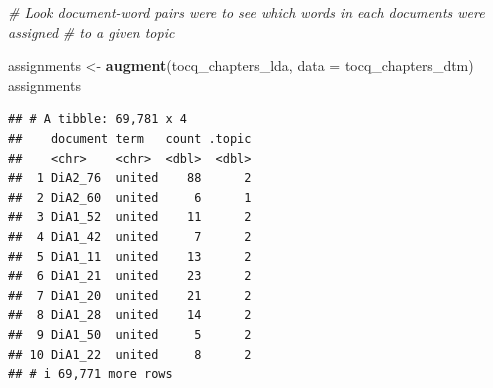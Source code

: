 \documentclass[
]{article}
\newenvironment{Shaded}{\begin{snugshade}}{\end{snugshade}}
\newcommand{\AttributeTok}[1]{\textcolor[rgb]{0.13,0.29,0.53}{#1}}
\newcommand{\CommentTok}[1]{\textcolor[rgb]{0.56,0.35,0.01}{\textit{#1}}}
\newcommand{\FunctionTok}[1]{\textcolor[rgb]{0.13,0.29,0.53}{\textbf{#1}}}
\newcommand{\NormalTok}[1]{#1}
\newcommand{\OtherTok}[1]{\textcolor[rgb]{0.56,0.35,0.01}{#1}}
\begin{document}
\begin{Shaded}
\begin{Highlighting}[]
\CommentTok{\# Look document{-}word pairs were to see which words in each documents were assigned}
\CommentTok{\# to a given topic}

\NormalTok{assignments }\OtherTok{\textless{}{-}} \FunctionTok{augment}\NormalTok{(tocq\_chapters\_lda, }\AttributeTok{data =}\NormalTok{ tocq\_chapters\_dtm)}
\NormalTok{assignments}
\end{Highlighting}
\end{Shaded}

\begin{verbatim}
## # A tibble: 69,781 x 4
##    document term   count .topic
##    <chr>    <chr>  <dbl>  <dbl>
##  1 DiA2_76  united    88      2
##  2 DiA2_60  united     6      1
##  3 DiA1_52  united    11      2
##  4 DiA1_42  united     7      2
##  5 DiA1_11  united    13      2
##  6 DiA1_21  united    23      2
##  7 DiA1_20  united    21      2
##  8 DiA1_28  united    14      2
##  9 DiA1_50  united     5      2
## 10 DiA1_22  united     8      2
## # i 69,771 more rows
\end{verbatim}
\end{document}
